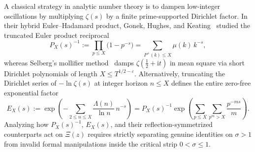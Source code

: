 \documentclass[11pt,reqno]{amsart}
\theoremstyle{definition}
\theoremstyle{remark}
\numberwithin{equation}{section}
\newcommand{\ii}{\mathrm{i}}
\begin{document}
A classical strategy in analytic number theory is to dampen low-integer oscillations by multiplying $\zeta(s)$ by a finite prime-supported Dirichlet factor. In their hybrid Euler--Hadamard product, Gonek, Hughes, and Keating~\cite{gonekhugheskeating2007} studied the truncated Euler product reciprocal
\begin{equation}\label{eq:GHK_def}
P_X(s)^{-1} := \prod_{p \le X}\bigl(1 - p^{-s}\bigr) = \sum_{P^+(k) \le X} \mu(k)\,k^{-s},
\end{equation}
whereas Selberg's mollifier method~\cite{selberg1942} damps $\zeta(\frac{1}{2}+\ii t)$ in mean square via short Dirichlet polynomials of length $X \le T^{1/2-\varepsilon}$. Alternatively, truncating the Dirichlet series of $-\ln\zeta(s)$ at integer horizon $n \le X$ defines the entire zero-free exponential factor
\begin{equation}\label{eq:EX_def}
E_X(s) := \exp\!\left(-\sum_{2 \le n \le X} \frac{\Lambda(n)}{\ln n}\,n^{-s}\right) = P_X(s)^{-1}\exp\!\left(\sum_{p \le X}\sum_{p^m > X} \frac{p^{-ms}}{m}\right).
\end{equation}
Analyzing how $P_X(s)^{-1}$, $E_X(s)$, and their reflection-symmetrized counterparts act on $\Xi(z)$ requires strictly separating genuine identities on $\sigma > 1$ from invalid formal manipulations inside the critical strip $0 < \sigma \le 1$.
\end{document}
